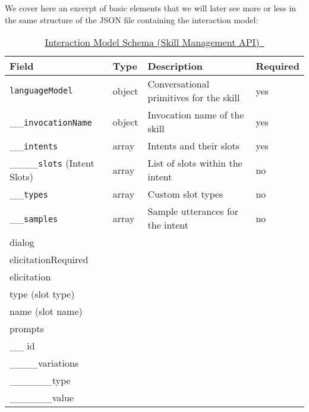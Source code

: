 We cover here an excerpt of basic elements that we will later see more or less in the same structure of the JSON file containing the interaction model:




\begin{table}[h]
\caption[Interaction Model Schema]{\href{https://developer.amazon.com/docs/smapi/interaction-model-schema.html}{Interaction Model Schema (Skill Management API)~\cite{alexaDesignGuide} }}\label{interactionModel}
	\begin{tabularx}{\textwidth}{|l | l l l | }
	Field	&	Type	&	Description		&	Required \\ \hline
\lstinline|languageModel| &	object	& Conversational primitives for the skill	& yes\\
\_\_\lstinline|invocationName| &	object	& Invocation name of the skill	& yes\\
\_\_\lstinline|intents| &	array	& Intents and their slots	& yes\\
\_\_\_\_\lstinline|slots| (Intent Slots) & array & List of slots within the intent	& no\\
\_\_\lstinline|types| &	array	& Custom slot types		& no\\
\_\_\lstinline|samples|	& array	 & Sample utterances for the intent	& no\\

dialog & & & \\
elicitationRequired & & & \\
elicitation & & & \\
type (slot type) & & & \\
name (slot name) & & & \\

prompts & & & \\
\_\_ id  & & & \\
\_\_\_\_variations  & & & \\
\_\_\_\_\_\_type  & & & \\
\_\_\_\_\_\_value  & & & \\ \hline
			
	\end{tabularx}			
\end{table}






